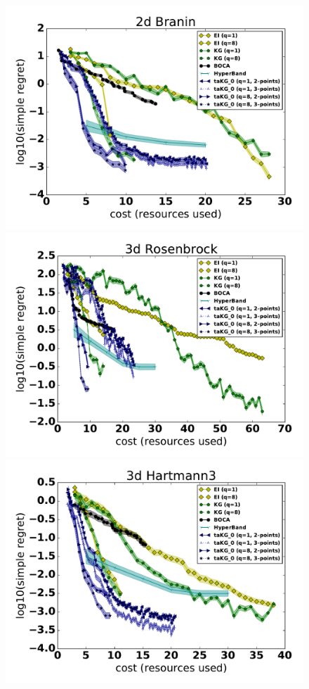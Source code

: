 \documentclass[letterpaper]{article}
\numberwithin{equation}{section}
\begin{document}
\begin{figure}[tb]
\centering
  \subfigure
  \centering
  \includegraphics[width=\figwidth, height = \figheight]{fig/Branin.pdf}
  \subfigure
  \centering
  \includegraphics[width=\figwidth, height = \figheight]{fig/Rosenbrock.pdf}\\
    \subfigure
  \centering
\includegraphics[width=\figwidth, height = \figheight]{fig/Hartmann3.pdf}

\end{figure}
\end{document}
